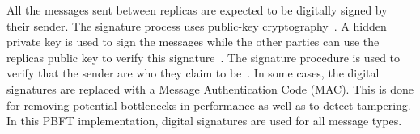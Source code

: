 All the messages sent between replicas are expected to be digitally signed by their sender. The signature process uses public-key cryptography~\cite[p.~257,p.267]{BOOK:BuildDepDistSyst}. A hidden private key is used to sign the messages while the other parties can use the replicas public key to verify this signature~\cite[p.~417]{PAPER:PBFTRecovery}. The signature procedure is used to verify that the sender are who they claim to be~\cite[p.~3]{PAPER:OGPBFT}. In some cases, the digital signatures are replaced with a Message Authentication Code (MAC). This is done for removing potential bottlenecks in performance as well as to detect tampering\cites[p.~257]{BOOK:BuildDepDistSyst}[p.~3,8]{PAPER:OGPBFT}. In this PBFT implementation, digital signatures are used for all message types.


